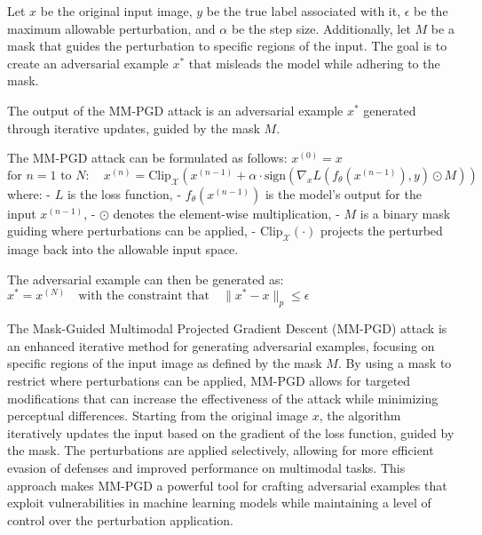 Let $x$ be the original input image, $y$ be the true label associated with it, $\epsilon$ be the maximum allowable perturbation, and $\alpha$ be the step size. Additionally, let $M$ be a mask that guides the perturbation to specific regions of the input. The goal is to create an adversarial example $x^*$ that misleads the model while adhering to the mask.

The output of the MM-PGD attack is an adversarial example $x^*$ generated through iterative updates, guided by the mask $M$.

The MM-PGD attack can be formulated as follows:
$x^{(0)} = x$
$\text{for } n = 1 \text{ to } N: \quad
x^{(n)} = \text{Clip}_{\mathcal{X}} \left( x^{(n-1)} + \alpha \cdot \text{sign} \left( \nabla_x L(f_\theta(x^{(n-1)}), y) \odot M \right) \right)$
where:
- $L$ is the loss function,
- $f_\theta(x^{(n-1)})$ is the model's output for the input $x^{(n-1)}$,
- $\odot$ denotes the element-wise multiplication,
- $M$ is a binary mask guiding where perturbations can be applied,
- $\text{Clip}_{\mathcal{X}}(\cdot)$ projects the perturbed image back into the allowable input space.

The adversarial example can then be generated as:
$x^* = x^{(N)} \quad \text{with the constraint that} \quad \|x^* - x\|_p \leq \epsilon$

The Mask-Guided Multimodal Projected Gradient Descent (MM-PGD) attack is an enhanced iterative method for generating adversarial examples, focusing on specific regions of the input image as defined by the mask $M$. By using a mask to restrict where perturbations can be applied, MM-PGD allows for targeted modifications that can increase the effectiveness of the attack while minimizing perceptual differences. Starting from the original image $x$, the algorithm iteratively updates the input based on the gradient of the loss function, guided by the mask. The perturbations are applied selectively, allowing for more efficient evasion of defenses and improved performance on multimodal tasks. This approach makes MM-PGD a powerful tool for crafting adversarial examples that exploit vulnerabilities in machine learning models while maintaining a level of control over the perturbation application.

